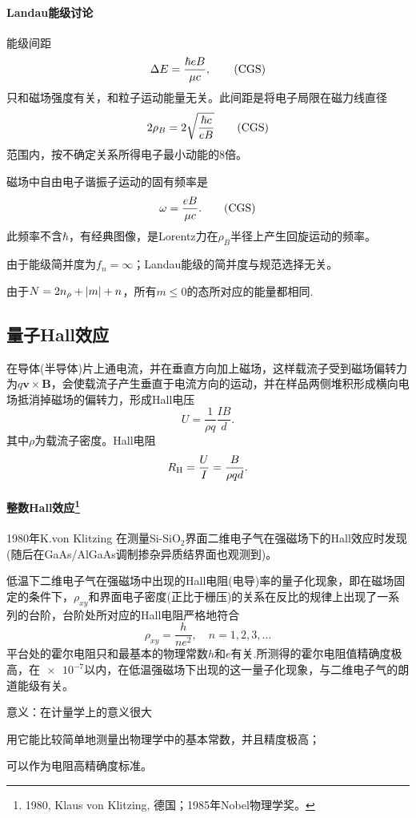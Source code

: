 \paragraph*{Landau能级讨论}
\begin{compactenum}
	\item 能级间距
		\[
			\D E=\frac{\hbar eB}{\mu c},\CGS
		\]
		只和磁场强度有关，和粒子运动能量无关。此间距是将电子局限在磁力线直径
		\[
			2\rho_B=2\sqrt{\frac{\hbar c}{eB}}\CGS
		\]
		范围内，按不确定关系所得电子最小动能的8倍。
	\item 磁场中自由电子谐振子运动的固有频率是
		\[
			\omega=\frac{eB}{\mu c}.\CGS
		\]
		此频率不含$\hbar$，有经典图像，是Lorentz力在$\rho_B$半径上产生回旋运动的频率。
	\item 由于能级简并度为$f_n=\infty$；Landau能级的简并度与规范选择无关。

		由于$N=2n_\rho+\left\lvert m\right\rvert+n$，所有$m\leqslant 0$的态所对应的能量都相同.
\end{compactenum}
\subsection{量子Hall效应}
在导体(半导体)片上通电流，并在垂直方向加上磁场，这样载流子受到磁场偏转力为$q\bm v\times\bm B$，会使载流子产生垂直于电流方向的运动，并在样品两侧堆积形成横向电场抵消掉磁场的偏转力，形成Hall电压
\[
U=\frac1{\rho q}\frac{IB}d.
\]
其中$\rho$为载流子密度。Hall电阻
\[
R_\mathrm H=\frac UI=\frac B{\rho qd}.
\]
\paragraph*{整数Hall效应\footnote{1980, Klaus von Klitzing, 德国；1985年Nobel物理学奖。}}
1980年K.von Klitzing 在测量Si-SiO$_2$界面二维电子气在强磁场下的Hall效应时发现(随后在GaAs/AlGaAs调制掺杂异质结界面也观测到)。

低温下二维电子气在强磁场中出现的Hall电阻(电导)率的量子化现象，即在磁场固定的条件下，$\rho_{xy}$和界面电子密度(正比于栅压)的关系在反比的规律上出现了一系列的台阶，台阶处所对应的Hall电阻严格地符合
\[
	\rho_{xy}=\frac h{ne^2},\quad n=1,2,3,\ldots
\]
平台处的霍尔电阻只和最基本的物理常数$h$和$e$有关.所测得的霍尔电阻值精确度极高，在$\num{e-7}$以内，在低温强磁场下出现的这一量子化现象，与二维电子气的朗道能级有关。

意义：在计量学上的意义很大
\begin{compactenum}
	\item 用它能比较简单地测量出物理学中的基本常数，并且精度极高；
	\item 可以作为电阻高精确度标准。
\end{compactenum}

